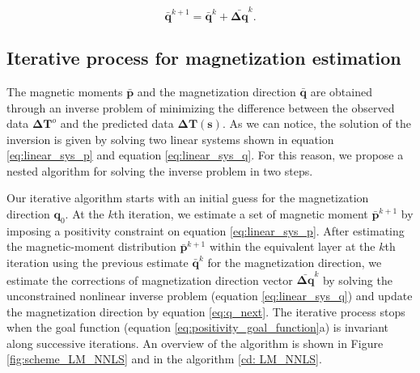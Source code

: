 \begin{equation}
\bar{\mathbf{q}}^{k+1} = \bar{\mathbf{q}}^{k} + \bar{\mathbf{\Delta q}}^{k}.
\label{eq:q_next}
\end{equation}

\subsection{Iterative process for magnetization estimation}

The magnetic moments $\bar{\mathbf{p}}$ and the magnetization direction $\bar{\mathbf{q}}$ are obtained through an inverse problem of minimizing the difference between the observed data $ \mathbf{\Delta T}^o $ and the predicted data $\mathbf{\Delta T} (\mathbf{s})$. As we can notice, the solution of the inversion is given by solving two linear systems shown in equation \ref{eq:linear_sys_p} and equation \ref{eq:linear_sys_q}. For this reason, we propose a nested algorithm for solving the inverse problem in two steps.           

Our iterative algorithm starts with an initial guess for the magnetization direction $\mathbf{q}_0$. At the $k$th iteration, we estimate a set of magnetic moment $\bar{\mathbf{p}}^{k+1}$ by imposing a positivity constraint on equation \ref{eq:linear_sys_p}. After estimating the magnetic-moment distribution $\bar{\mathbf{p}}^{k+1}$ within the equivalent layer at the $k$th iteration using the previous estimate $\bar{\mathbf{q}}^{k}$ for the magnetization direction, we estimate the corrections of magnetization direction vector $\bar{\mathbf{\Delta q}}^{k}$ by solving the unconstrained nonlinear inverse problem (equation \ref{eq:linear_sys_q}) and update the magnetization direction by equation \ref{eq:q_next}. The iterative process stops when the goal function (equation \ref{eq:positivity_goal_function}a) is invariant along successive iterations. An overview of the algorithm is shown in Figure \ref{fig:scheme_LM_NNLS} and in the algorithm \ref{cd: LM_NNLS}. 

